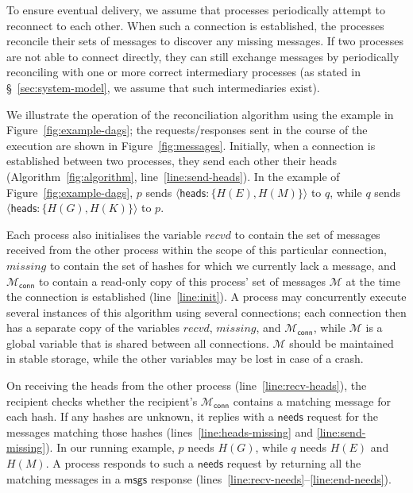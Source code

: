 \documentclass[a4paper,anonymous,USenglish]{lipics-v2019}
\begin{document}
To ensure eventual delivery, we assume that processes periodically attempt to reconnect to each other.
When such a connection is established, the processes reconcile their sets of messages to discover any missing messages.
If two processes are not able to connect directly, they can still exchange messages by periodically reconciling with one or more correct intermediary processes (as stated in \S~\ref{sec:system-model}, we assume that such intermediaries exist).

We illustrate the operation of the reconciliation algorithm using the example in Figure~\ref{fig:example-dags}; the requests/responses sent in the course of the execution are shown in Figure~\ref{fig:messages}.
Initially, when a connection is established between two processes, they send each other their heads (Algorithm~\ref{fig:algorithm}, line~\ref{line:send-heads}).
In the example of Figure~\ref{fig:example-dags}, $p$ sends $\langle\mathsf{heads}: \{H(E),H(M)\}\rangle$ to $q$, while $q$ sends $\langle\mathsf{heads}: \{H(G),H(K)\}\rangle$ to $p$.

Each process also initialises the variable $\mathit{recvd}$ to contain the set of messages received from the other process within the scope of this particular connection, $\mathit{missing}$ to contain the set of hashes for which we currently lack a message, and $\mathcal{M}_\mathsf{conn}$ to contain a read-only copy of this process' set of messages $\mathcal{M}$ at the time the connection is established (line~\ref{line:init}).
A process may concurrently execute several instances of this algorithm using several connections; each connection then has a separate copy of the variables $\mathit{recvd}$, $\mathit{missing}$, and $\mathcal{M}_\mathsf{conn}$, while $\mathcal{M}$ is a global variable that is shared between all connections.
$\mathcal{M}$ should be maintained in stable storage, while the other variables may be lost in case of a crash.

On receiving the heads from the other process (line~\ref{line:recv-heads}), the recipient checks whether the recipient's $\mathcal{M}_\mathsf{conn}$ contains a matching message for each hash.
If any hashes are unknown, it replies with a $\mathsf{needs}$ request for the messages matching those hashes (lines~\ref{line:heads-missing} and \ref{line:send-missing}).
In our running example, $p$ needs $H(G)$, while $q$ needs $H(E)$ and $H(M)$.
A process responds to such a $\mathsf{needs}$ request by returning all the matching messages in a $\mathsf{msgs}$ response (lines~\ref{line:recv-needs}--\ref{line:end-needs}).
\end{document}

